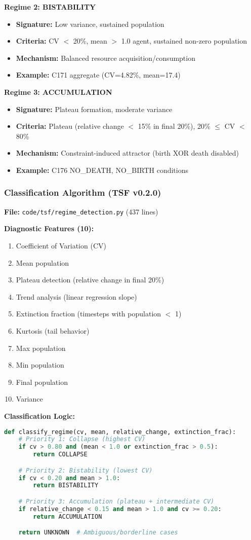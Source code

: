 \documentclass[11pt]{article}
\begin{document}
\textbf{Regime 2: BISTABILITY}
\begin{itemize}
\item \textbf{Signature:} Low variance, sustained population
\item \textbf{Criteria:} CV $<$ 20\%, mean $>$ 1.0 agent, sustained non-zero population
\item \textbf{Mechanism:} Balanced resource acquisition/consumption
\item \textbf{Example:} C171 aggregate (CV=4.82\%, mean=17.4)
\end{itemize}

\textbf{Regime 3: ACCUMULATION}
\begin{itemize}
\item \textbf{Signature:} Plateau formation, moderate variance
\item \textbf{Criteria:} Plateau (relative change $<$ 15\% in final 20\%), 20\% $\leq$ CV $<$ 80\%
\item \textbf{Mechanism:} Constraint-induced attractor (birth XOR death disabled)
\item \textbf{Example:} C176 NO\_DEATH, NO\_BIRTH conditions
\end{itemize}

\subsubsection{Classification Algorithm (TSF v0.2.0)}

\textbf{File:} \texttt{code/tsf/regime\_detection.py} (437 lines)

\textbf{Diagnostic Features (10):}
\begin{enumerate}
\item Coefficient of Variation (CV)
\item Mean population
\item Plateau detection (relative change in final 20\%)
\item Trend analysis (linear regression slope)
\item Extinction fraction (timesteps with population $<$ 1)
\item Kurtosis (tail behavior)
\item Max population
\item Min population
\item Final population
\item Variance
\end{enumerate}

\textbf{Classification Logic:}
\begin{lstlisting}[language=Python]
def classify_regime(cv, mean, relative_change, extinction_frac):
    # Priority 1: Collapse (highest CV)
    if cv > 0.80 and (mean < 1.0 or extinction_frac > 0.5):
        return COLLAPSE

    # Priority 2: Bistability (lowest CV)
    if cv < 0.20 and mean > 1.0:
        return BISTABILITY

    # Priority 3: Accumulation (plateau + intermediate CV)
    if relative_change < 0.15 and mean > 1.0 and cv >= 0.20:
        return ACCUMULATION

    return UNKNOWN  # Ambiguous/borderline cases
\end{lstlisting}
\end{document}
